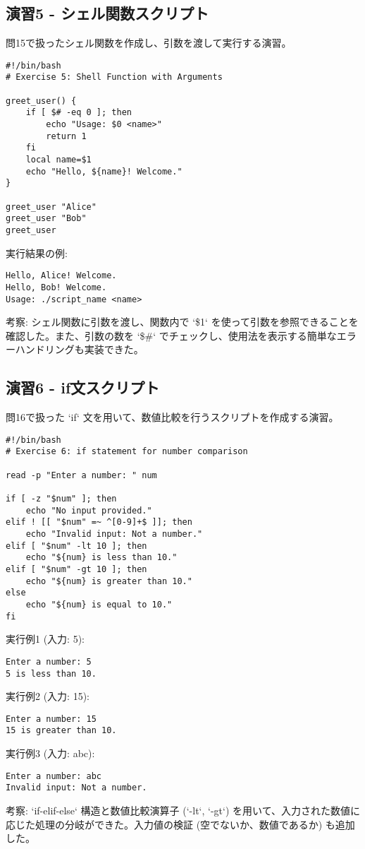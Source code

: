 \documentclass[a4paper,11pt]{jsarticle}
\begin{document}
\subsection*{演習5 - シェル関数スクリプト}
問15で扱ったシェル関数を作成し、引数を渡して実行する演習。
\begin{lstlisting}[caption=演習5 シェル関数のスクリプト例]
#!/bin/bash
# Exercise 5: Shell Function with Arguments

greet_user() {
    if [ $# -eq 0 ]; then
        echo "Usage: $0 <name>"
        return 1
    fi
    local name=$1
    echo "Hello, ${name}! Welcome."
}

greet_user "Alice"
greet_user "Bob"
greet_user
\end{lstlisting}
実行結果の例:
\begin{verbatim}
Hello, Alice! Welcome.
Hello, Bob! Welcome.
Usage: ./script_name <name>
\end{verbatim}
考察: シェル関数に引数を渡し、関数内で `\$1` を使って引数を参照できることを確認した。また、引数の数を `\$\#` でチェックし、使用法を表示する簡単なエラーハンドリングも実装できた。

\subsection*{演習6 - if文スクリプト}
問16で扱った `if` 文を用いて、数値比較を行うスクリプトを作成する演習。
\begin{lstlisting}[caption=演習6 if文のスクリプト例]
#!/bin/bash
# Exercise 6: if statement for number comparison

read -p "Enter a number: " num

if [ -z "$num" ]; then
    echo "No input provided."
elif ! [[ "$num" =~ ^[0-9]+$ ]]; then
    echo "Invalid input: Not a number."
elif [ "$num" -lt 10 ]; then
    echo "${num} is less than 10."
elif [ "$num" -gt 10 ]; then
    echo "${num} is greater than 10."
else
    echo "${num} is equal to 10."
fi
\end{lstlisting}
実行例1 (入力: 5):
\begin{verbatim}
Enter a number: 5
5 is less than 10.
\end{verbatim}
実行例2 (入力: 15):
\begin{verbatim}
Enter a number: 15
15 is greater than 10.
\end{verbatim}
実行例3 (入力: abc):
\begin{verbatim}
Enter a number: abc
Invalid input: Not a number.
\end{verbatim}
考察: `if-elif-else` 構造と数値比較演算子 (`-lt`, `-gt`) を用いて、入力された数値に応じた処理の分岐ができた。入力値の検証 (空でないか、数値であるか) も追加した。
\end{document}
